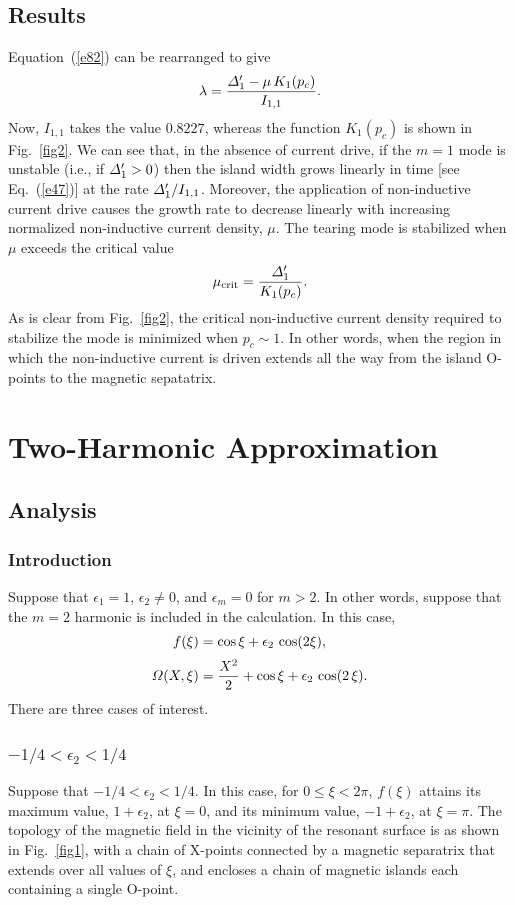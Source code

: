 \documentclass[12pt,prb,aps]{revtex4-1}
\begin{document}
\subsection{Results}
Equation~(\ref{e82}) can be rearranged to give
\begin{equation}
\lambda = \frac{{\mit\Delta}_1'-\mu\,K_1(p_c)}{I_{1,1}}.
\end{equation}
Now, $I_{1,1}$ takes the value $0.8227$, whereas the function $K_1(p_c)$ is shown in Fig.~\ref{fig2}. 
We can see that, in the absence of current drive, if the $m=1$ mode is unstable (i.e., if ${\mit\Delta}_1'> 0$) then the island width grows linearly in time  [see Eq.~(\ref{e47})] at the rate ${\mit\Delta}_1'/I_{1,1}$.\cite{ruth}
Moreover, the application of non-inductive current drive causes the growth rate to decrease linearly with
increasing normalized non-inductive current density, $\mu$. The tearing mode is stabilized when $\mu$ exceeds the critical value
\begin{equation}
\mu_{\rm crit} =\frac{{\mit\Delta}_1'}{K_1(p_c)}.
\end{equation}
As is clear from Fig.~\ref{fig2}, the critical non-inductive current density required to stabilize the mode is minimized when $p_c\sim 1$. In other words, when the region in which the non-inductive current is driven extends all the way from the island O-points to the magnetic sepatatrix.  

\section{Two-Harmonic Approximation}
\subsection{Analysis}
\subsubsection{Introduction}
Suppose that $\epsilon_1=1$, $\epsilon_2\neq 0$,  and $\epsilon_m=0$ for $m>2$. In other words, suppose that the $m=2$ harmonic
is included in the calculation. In this case,
\begin{align}
f(\xi) &= \cos\xi + \epsilon_2\,\cos(2\xi),\label{e71a}\\[0.5ex]
{\mit\Omega}(X,\xi) &= \frac{X^2}{2}+\cos\xi + \epsilon_2\,\cos(2\,\xi).
\end{align}
There are three cases of interest.

\subsubsection{$-1/4 < \epsilon_2 < 1/4$}
Suppose that $-1/4<\epsilon_2< 1/4$. In this case, for $0\leq \xi< 2\pi$, $f(\xi)$ attains its maximum value, $1+\epsilon_2$, at $\xi=0$, and its minimum value, $-1+\epsilon_2$, at $\xi=\pi$.  The topology of the magnetic field 
in the vicinity of the resonant surface is as shown in Fig.~\ref{fig1}, with a chain of X-points connected by a
magnetic separatrix that extends over all values of $\xi$, and encloses a chain of magnetic islands each containing a
single O-point. 
\end{document}
